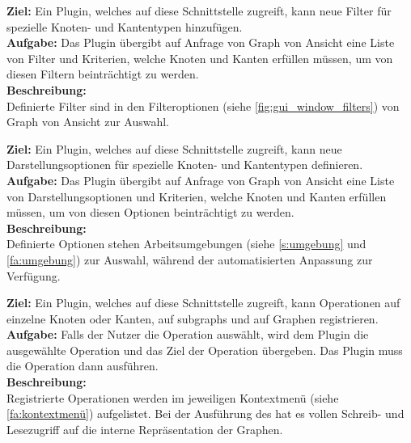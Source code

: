 \label{s:filter}
\textbf{Ziel:} Ein Plugin, welches auf diese Schnittstelle zugreift, kann neue Filter für spezielle Knoten- und Kantentypen hinzufügen.\\
\textbf{Aufgabe:}
Das Plugin übergibt auf Anfrage von Graph von Ansicht eine Liste von Filter und Kriterien, welche Knoten und Kanten erfüllen müssen, um von diesen Filtern beinträchtigt zu werden.\\
\textbf{Beschreibung:}\\
Definierte Filter sind in den Filteroptionen (siehe \ref{fig:gui_window_filters}) von Graph von Ansicht zur Auswahl.

\label{s:darstellung}
\textbf{Ziel:} Ein Plugin, welches auf diese Schnittstelle zugreift, kann neue Darstellungsoptionen für spezielle Knoten- und Kantentypen definieren.\\
\textbf{Aufgabe:}
Das Plugin übergibt auf Anfrage von Graph von Ansicht eine Liste von Darstellungsoptionen und Kriterien, welche Knoten und Kanten erfüllen müssen, um von diesen Optionen beinträchtigt zu werden.\\
\textbf{Beschreibung:}\\
Definierte Optionen stehen Arbeitsumgebungen (siehe \ref{s:umgebung} und \ref{fa:umgebung}) zur Auswahl, während der automatisierten Anpassung zur Verfügung.

\label{s:operationen}
\textbf{Ziel:} Ein Plugin, welches auf diese Schnittstelle zugreift, kann Operationen auf einzelne Knoten oder Kanten, auf \glspl{subgraph} und auf Graphen registrieren.\\
\textbf{Aufgabe:}
Falls der Nutzer die Operation auswählt, wird dem Plugin die ausgewählte Operation und das Ziel der Operation übergeben. Das Plugin muss die Operation dann ausführen.\\
\textbf{Beschreibung:}\\
Registrierte Operationen werden im jeweiligen Kontextmenü (siehe \ref{fa:kontextmenü}) aufgelistet.
Bei der Ausführung des hat es vollen Schreib- und Lesezugriff auf die interne Repräsentation der Graphen.\\
